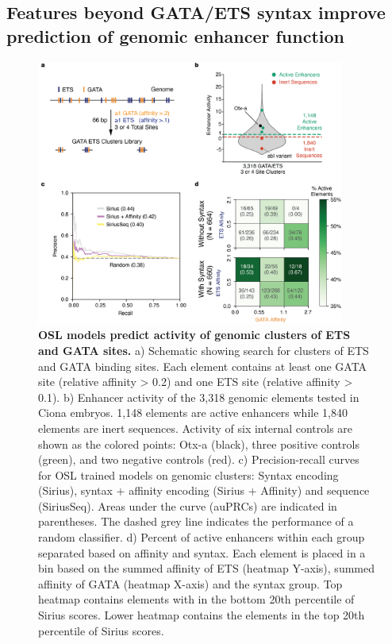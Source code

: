 \subsection{Features beyond GATA/ETS syntax improve prediction of genomic enhancer function}

\begin{figure}[p]
    \centering
    \includegraphics[width=0.9\textwidth, height=0.745\textheight]{2_figures-and-files/Fig5.png}
    \caption[OSL models predict activity of genomic clusters of ETS and GATA sites.]{\textbf{OSL models predict activity of genomic clusters of ETS and GATA sites.} a) Schematic showing search for clusters of ETS and GATA binding sites. Each element contains at least one GATA site (relative affinity > 0.2) and one ETS site (relative affinity > 0.1). b) Enhancer activity of the 3,318 genomic elements tested in Ciona embryos. 1,148 elements are active enhancers while 1,840 elements are inert sequences. Activity of six internal controls are shown as the colored points: Otx-a (black), three positive controls (green), and two negative controls (red). c) Precision-recall curves for OSL trained models on genomic clusters: Syntax encoding (Sirius), syntax + affinity encoding (Sirius + Affinity) and sequence (SiriusSeq). Areas under the curve (auPRCs) are indicated in parentheses. The dashed grey line indicates the performance of a random classifier. d) Percent of active enhancers within each group separated based on affinity and syntax. Each element is placed in a bin based on the summed affinity of ETS (heatmap Y-axis), summed affinity of GATA (heatmap X-axis) and the syntax group. Top heatmap contains elements with in the bottom 20th percentile of Sirius scores. Lower heatmap contains the elements in the top 20th percentile of Sirius scores.}
    \label{fig:2 Figure 5}
\end{figure}

